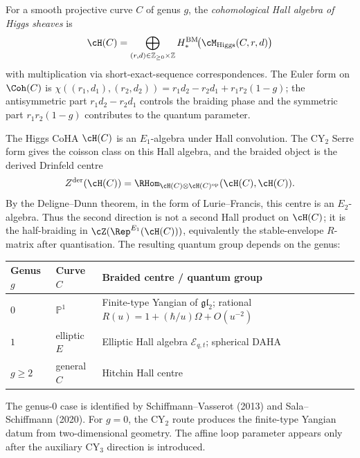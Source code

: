 \begin{definition}
\label{def:thy-higgs-coha}
For a smooth projective curve $C$ of genus $g$, the
\emph{cohomological Hall algebra of Higgs sheaves} is
\[
\cH(C)=\bigoplus_{(r,d)\in\mathbb{Z}_{\geq 0}\times\mathbb{Z}}
H^{\mathrm{BM}}_*\!\bigl(\cM_{\mathrm{Higgs}}(C,r,d)\bigr)
\]
with multiplication via short-exact-sequence correspondences.
The Euler form on $\Coh(C)$ is
$\chi((r_1,d_1),(r_2,d_2))=r_1 d_2-r_2 d_1+r_1 r_2(1-g)$; the
antisymmetric part $r_1 d_2-r_2 d_1$ controls the braiding phase and
the symmetric part $r_1 r_2(1-g)$ contributes to the quantum parameter.
\end{definition}

\begin{theorem}
\label{thm:thy-higgs-cy2-e2}
The Higgs CoHA $\cH(C)$ is an $E_1$-algebra under Hall convolution.
The CY$_2$ Serre form gives the coisson class on this Hall algebra, and
the braided object is the derived Drinfeld centre
\[
 Z^{\mathrm{der}}(\cH(C))=\RHom_{\cH(C)\otimes \cH(C)^{\mathrm{op}}}
 (\cH(C),\cH(C)).
\]
By the Deligne--Dunn theorem, in the form of Lurie--Francis, this centre
is an $E_2$-algebra. Thus the second direction is not a second Hall
product on $\cH(C)$; it is the half-braiding in
$\cZ(\Rep^{E_1}(\cH(C)))$, equivalently the stable-envelope
$R$-matrix after quantisation. The resulting quantum group depends on
the genus:

\begin{center}
\renewcommand{\arraystretch}{1.3}
\begin{tabular}{lll}
\hline
Genus $g$ & Curve $C$ & Braided centre / quantum group \\
\hline
$0$ & $\mathbb{P}^1$ & Finite-type Yangian of $\mathfrak{gl}_2$;
 rational $R(u)=1+(\hbar/u)\Omega+O(u^{-2})$\strut\\
$1$ & elliptic $E$ & Elliptic Hall algebra $\mathcal{E}_{q,t}$;
 spherical DAHA\strut\\
$g\geq 2$ & general $C$ & Hitchin Hall centre\strut\\
\hline
\end{tabular}
\end{center}

The genus-$0$ case is identified by Schiffmann--Vasserot (2013) and
Sala--Schiffmann (2020). For $g=0$, the $\mathrm{CY}_2$ route produces
the finite-type Yangian datum from two-dimensional geometry. The affine
loop parameter appears only after the auxiliary $\mathrm{CY}_3$ direction
is introduced.
\end{theorem}

